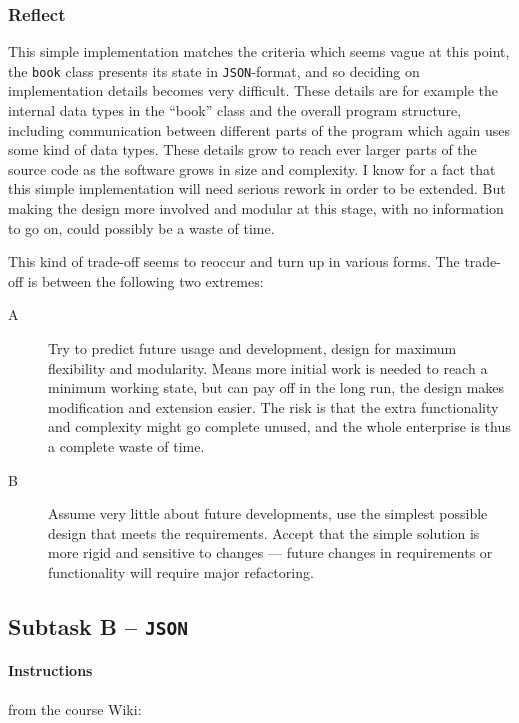 \subsubsection{Reflect}\label{task-1a-reflect}
This simple implementation matches the criteria which seems vague at this point,
the \texttt{book} class presents its state in \texttt{JSON}-format, and so deciding on
implementation details becomes very difficult. These details are for example
the internal data types in the ``book'' class and the overall program
structure, including communication between different parts of the program which
again uses some kind of data types.
These details grow to reach ever larger parts of the source code as the software
grows in size and complexity.
I know for a fact that this simple implementation will need serious rework
in order to be extended. But making the design more involved and modular
at this stage, with no information to go on, could possibly be a waste of time.

This kind of trade-off seems to reoccur and turn up in various forms.
The trade-off is between the following two extremes:

\begin{description}
  \item [A] Try to predict future usage and development, design for maximum
        flexibility and modularity. Means more initial work is needed to reach
        a minimum working state, but can pay off in the long run, the design
        makes modification and extension easier.  The risk is that the extra
        functionality and complexity might go complete unused, and the whole
        enterprise is thus a complete waste of time.
  \item [B] Assume very little about future developments, use the simplest
        possible design that meets the requirements. Accept that the simple
        solution is more rigid and sensitive to changes --- future changes in
        requirements or functionality will require major refactoring.
\end{description}


\subsection{Subtask B -- \texttt{JSON}}\label{task-1b}
\paragraph{Instructions}\label{task-1b-instructions}
from the course Wiki\cite{1dv600:lab1:instructions}:

